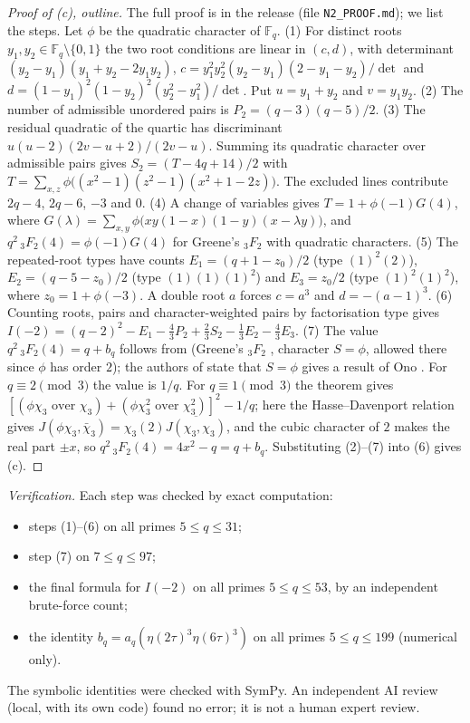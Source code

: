 \begin{proof}[Proof of (c), outline]
The full proof is in the release (file \texttt{N2\_PROOF.md}); we list the steps. Let $\phi$ be the quadratic character of $\mathbb F_q$.
(1) For distinct roots $y_1,y_2\in\mathbb F_q\setminus\{0,1\}$ the two root conditions are linear in $(c,d)$, with determinant
$(y_2-y_1)(y_1+y_2-2y_1y_2)$, $c=y_1^2y_2^2(y_2-y_1)(2-y_1-y_2)/\det$ and $d=(1-y_1)^2(1-y_2)^2(y_2^2-y_1^2)/\det$.
Put $u=y_1+y_2$ and $v=y_1y_2$.
(2) The number of admissible unordered pairs is $P_2=(q-3)(q-5)/2$.
(3) The residual quadratic of the quartic has discriminant $u(u-2)(2v-u+2)/(2v-u)$. Summing its quadratic character over admissible pairs gives
$S_2=(T-4q+14)/2$ with $T=\sum_{x,z}\phi\big((x^2-1)(z^2-1)(x^2+1-2z)\big)$. The excluded lines contribute $2q-4$, $2q-6$, $-3$ and $0$.
(4) A change of variables gives $T=1+\phi(-1)G(4)$, where $G(\lambda)=\sum_{x,y}\phi\big(xy(1-x)(1-y)(x-\lambda y)\big)$, and $q^2\,{}_3F_2(4)=\phi(-1)G(4)$
for Greene's ${}_3F_2$ with quadratic characters.
(5) The repeated-root types have counts $E_1=(q+1-z_0)/2$ (type $(1)^2(2)$), $E_2=(q-5-z_0)/2$ (type $(1)(1)(1)^2$) and $E_3=z_0/2$ (type $(1)^2(1)^2$), where $z_0=1+\phi(-3)$. A double root $a$ forces $c=a^3$ and $d=-(a-1)^3$.
(6) Counting roots, pairs and character-weighted pairs by factorisation type gives
$I(-2)=(q-2)^2-E_1-\tfrac43P_2+\tfrac23S_2-\tfrac13E_2-\tfrac43E_3$.
(7) The value $q^2\,{}_3F_2(4)=q+b_q$ follows from \cite[Thm.~1.7]{BK} (Greene's ${}_3F_2$ \cite{Gre}, character $S=\phi$, allowed there since $\phi$ has order $2$); the authors of \cite{BK}
state that $S=\phi$ gives a result of Ono \cite{On}. For $q\equiv2\pmod 3$ the value is $1/q$.
For $q\equiv1\pmod3$ the theorem gives $[(\phi\chi_3\text{ over }\chi_3)+(\phi\chi_3^2\text{ over }\chi_3^2)]^2-1/q$; here the Hasse--Davenport relation \cite{IR} gives
$J(\phi\chi_3,\bar\chi_3)=\chi_3(2)\overline{J(\chi_3,\chi_3)}$, and the cubic character of $2$ \cite{IR} makes the real part $\pm x$, so $q^2\,{}_3F_2(4)=4x^2-q=q+b_q$.
Substituting (2)--(7) into (6) gives (c).
\end{proof}

\emph{Verification.} Each step was checked by exact computation:
\begin{itemize}
\item steps (1)--(6) on all primes $5\le q\le31$;
\item step (7) on $7\le q\le97$;
\item the final formula for $I(-2)$ on all primes $5\le q\le53$, by an independent brute-force count;
\item the identity $b_q=a_q(\eta(2\tau)^3\eta(6\tau)^3)$ on all primes $5\le q\le199$ (numerical only).
\end{itemize}
The symbolic identities were checked with SymPy. An independent AI review (local, with its own code) found no error; it is not a human expert review.

